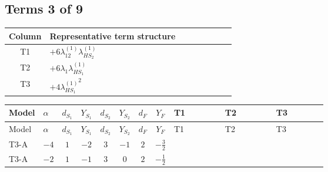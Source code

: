 \documentclass[8pt]{article}
\begin{document}
\begin{landscape}
\subsection*{Terms 3 of 9}
\begin{center}
\begin{tabular}{@{}c >{\raggedright\arraybackslash}p{0.82\linewidth}@{}}
\toprule
Column & Representative term structure \\
\midrule
T1 & \(\displaystyle +6 {\lambda_{12}^{(1)}} {\lambda_{HS_2}^{(1)}}\) \\
\midrule
T2 & \(\displaystyle +6 {\lambda_1} {\lambda_{HS_1}^{(1)}}\) \\
\midrule
T3 & \(\displaystyle +4 {\lambda_{HS_1}^{(1)}}^2\) \\
\midrule
\bottomrule
\end{tabular}
\end{center}
\smallskip
\tiny
\begin{longtable}{@{}llcccccc >{\raggedright\arraybackslash}p{0.21\linewidth} >{\raggedright\arraybackslash}p{0.21\linewidth} >{\raggedright\arraybackslash}p{0.21\linewidth}@{}}
\toprule
Model & $\alpha$ & $d_{S_1}$ & $Y_{S_1}$ & $d_{S_2}$ & $Y_{S_2}$ & $d_F$ & $Y_F$ & T1 & T2 & T3 \\
\midrule
\endfirsthead
\toprule
Model & $\alpha$ & $d_{S_1}$ & $Y_{S_1}$ & $d_{S_2}$ & $Y_{S_2}$ & $d_F$ & $Y_F$ & T1 & T2 & T3 \\
\midrule
\endhead
T3-A & $-4$ & $1$ & $-2$ & $3$ & $-1$ & $2$ & $-\frac{3}{2}$ & \scriptsize\adjustbox{max width=\linewidth}{$\begin{gathered} +6 {\lambda_{12}^{(1)}} {\lambda_{HS_2}^{(1)}}\end{gathered}$} & \scriptsize\adjustbox{max width=\linewidth}{$\begin{gathered} +6 {\lambda_1} {\lambda_{HS_1}^{(1)}}\end{gathered}$} & \scriptsize\adjustbox{max width=\linewidth}{$\begin{gathered} +4 {\lambda_{HS_1}^{(1)}}^2\end{gathered}$} \\
\midrule
T3-A & $-2$ & $1$ & $-1$ & $3$ & $0$ & $2$ & $-\frac{1}{2}$ & \scriptsize\adjustbox{max width=\linewidth}{$\begin{gathered} +6 {\lambda_{12}^{(1)}} {\lambda_{HS_2}^{(1)}}\end{gathered}$} & \scriptsize\adjustbox{max width=\linewidth}{$\begin{gathered} +6 {\lambda_1} {\lambda_{HS_1}^{(1)}}\end{gathered}$} & \scriptsize\adjustbox{max width=\linewidth}{$\begin{gathered} +4 {\lambda_{HS_1}^{(1)}}^2\end{gathered}$} \\

\end{longtable}
\end{landscape}
\end{document}

